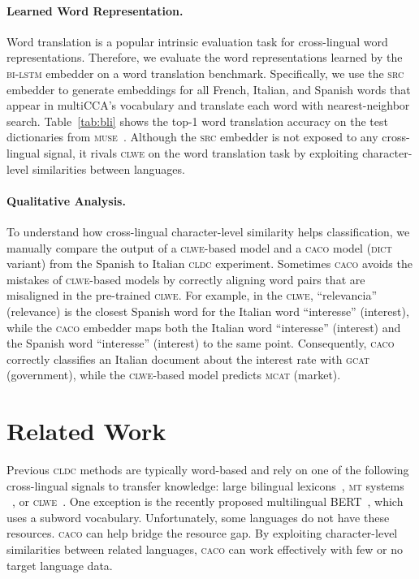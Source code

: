 \documentclass[letterpaper]{article} %
\newcommand{\citep}{\cite}
\newcommand{\abr}[1]{\textsc{#1}}
\newcommand{\name}[0]{\textsc{caco}}
\begin{document}
\paragraph{Learned Word Representation.}
Word translation is a popular intrinsic evaluation task for cross-lingual
word representations.
Therefore, we evaluate the word representations learned by the \abr{bi-lstm}
embedder on a word translation benchmark.
Specifically, we use the \abr{src} embedder to generate embeddings for all
French, Italian, and Spanish words that appear in multiCCA's vocabulary and
translate each word with nearest-neighbor search.
Table~\ref{tab:bli} shows the top-1 word translation accuracy on the test
dictionaries from \abr{muse}~\citep{conneau-18}.
Although the \abr{src} embedder is not exposed to any cross-lingual signal, it
rivals \abr{clwe} on the word translation task by exploiting character-level
similarities between languages.

\paragraph{Qualitative Analysis.}
To understand how cross-lingual character-level similarity helps
classification, we manually compare the output of a \abr{clwe}-based model and
a \name{} model (\abr{dict} variant) from the Spanish to Italian \abr{cldc}
experiment.
Sometimes \name{} avoids the mistakes of \abr{clwe}-based models by correctly
aligning word pairs that are misaligned in the pre-trained \abr{clwe}.
For example, in the \abr{clwe}, ``relevancia'' (relevance) is the closest
Spanish word for the Italian word ``interesse'' (interest), while the
\abr{caco} embedder maps both the Italian word ``interesse'' (interest) and the
Spanish word ``interesse'' (interest) to the same point.  Consequently,
\abr{caco} correctly classifies an Italian document about the interest rate
with \abr{gcat} (government), while the \abr{clwe}-based model predicts
\abr{mcat} (market).


\section{Related Work}\label{sec:related}

Previous \abr{cldc} methods are typically word-based and rely on one of the
following cross-lingual signals to transfer knowledge: large bilingual
lexicons~\citep{shi-10,andrade-15}, \abr{mt} systems
~\citep{banea-08-fixed,wan-09-fixed,zhou-16}, or
\abr{clwe}~\citep{klementiev-12}.
One exception is the recently proposed multilingual
BERT~\citep{devlin-19,wu-19}, which uses a subword vocabulary.
Unfortunately, some languages do not have these resources.
\name{} can help bridge the resource gap.
By exploiting character-level similarities between related languages, \name{}
can work effectively with few or no target language data.
\end{document}
